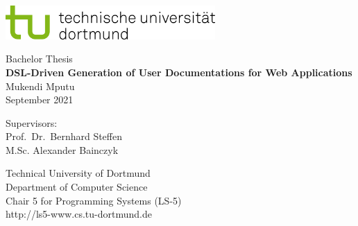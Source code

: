 \begin{titlepage}
\vspace*{-2cm}
\newlength{\links}
\setlength{\links}{-1.5cm}
\sffamily
\hspace*{\links}
\begin{minipage}{12.5cm}
\includegraphics[width=8cm]{bilder/tud_logo_rgb}
\end{minipage}

\vspace*{4cm}

\hspace*{\links}
\hspace*{-0.2cm}
\begin{minipage}{9cm}
\large
\begin{center}
{\Large Bachelor Thesis}\\
\vspace*{1cm}
\textbf{DSL-Driven Generation of User Documentations for Web Applications} \\
\vspace*{1cm}
Mukendi Mputu\\
September 2021
\end{center}
\end{minipage}
\normalsize
\vspace*{5.5cm}


\vspace*{2.1cm}

\hspace*{\links}
\begin{minipage}[b]{5cm}
\raggedright{}
Supervisors:\\
Prof.\ Dr.\ Bernhard Steffen\\
M.Sc. Alexander Bainczyk\\
\end{minipage}

\vspace*{2.5cm}
\hspace*{\links}
\begin{minipage}[b]{8cm}
\raggedright{}
Technical University of Dortmund \\
Department of Computer Science\\
Chair 5 for Programming Systems (LS-5)\\
http://ls5-www.cs.tu-dortmund.de
\end{minipage}

\end{titlepage}
